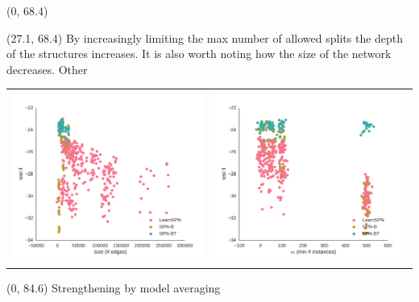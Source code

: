 \documentclass[final]{beamer}
\begin{document}
\begin{frame}{}
  \begin{textblock}{25.7}(0, 68.4)
    \footnotesize
    \blindtext
    
  \end{textblock}
  
  \begin{textblock}{25.7}(27.1, 68.4)
    \footnotesize
    By increasingly limiting the max number of allowed splits the depth of the
    structures increases. It is also worth noting how the size of the
    network decreases. 
    Other
    
    \begin{table}[ht]
      \setlength{\tabcolsep}{30pt}  
      \centering
      \begin{tabular}{c c}
        \includegraphics[width=0.4\linewidth]{figures/ll-depth/pumsb-star-ll-depth}&\includegraphics[width=0.4\linewidth]{figures/ll-m/pumsb-star-ll-m}
      \end{tabular}
    \end{table}
  \end{textblock}
  
  
  
  
  \begin{textblock}{80}(0, 84.6)
    Strengthening by model averaging
  \end{textblock}
  

\end{frame}
\end{document}
